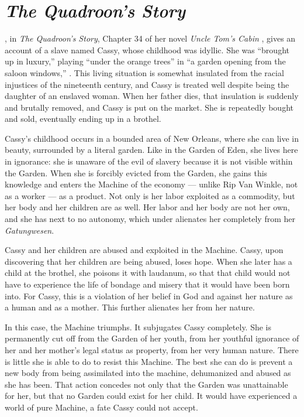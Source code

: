\documentclass[man,12pt,natbib]{apa6}
\begin{document}
\section{\emph{The Quadroon's Story}}

\citet{Stowe12}, in \emph{The Quadroon's Story}, Chapter 34 of her novel
\emph{Uncle Tom's Cabin} \citep{Stowe52}, gives an account of a slave named
Cassy, whose childhood was idyllic. She was  ``brought up in luxury,'' playing
``under the orange trees'' in ``a garden opening from the saloon windows,''
\citep[p.~895]{Stowe12}. This living situation is somewhat insulated from the
racial injustices of the nineteenth century, and Cassy is treated well despite
being the daughter of an enslaved woman. When her father dies, that insulation
is suddenly and brutally removed, and Cassy is put on the market. She is
repeatedly bought and sold, eventually ending up in a brothel.

Cassy's childhood occurs in a bounded area of New Orleans, where she can live
in beauty, surrounded by a literal garden. Like in the Garden of Eden, she
lives here in ignorance: she is unaware of the evil of slavery because it is
not visible within the Garden. When she is forcibly evicted from the Garden,
she gains this knowledge and enters the Machine of the economy --- unlike Rip
Van Winkle, not as a worker --- as a product. Not only is her labor exploited
as a commodity, but her body and her children are as well. Her labor and her
body are not her own, and she has next to no autonomy, which under
\citet{Marx44} alienates her completely from her \emph{Gatungwesen}.

Cassy and her children are abused and exploited in the Machine. Cassy, upon 
discovering that her children are being abused, loses hope. When she later 
has a child at the brothel, she poisons it with laudanum, so that that child
would not have to experience the life of bondage and misery that it would
have been born into. For Cassy, this is a violation of her belief in God
and against her nature as a human and as a mother. This further alienates 
her from her nature.

In this case, the Machine triumphs. It subjugates Cassy completely. She is
permanently cut off from the Garden of her youth, from her youthful ignorance
of her and her mother's legal status as property, from her very human nature.
There is little she is able to do to resist this Machine. The best she can do
is prevent a new body from being assimilated into the machine, dehumanized
and abused as she has been. That action concedes not only that the Garden was
unattainable for her, but that no Garden could exist for her child. It would
have experienced a world of pure Machine, a fate Cassy could not accept.
\end{document}
